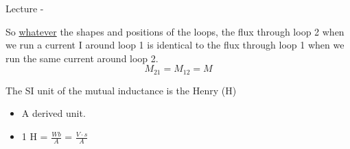 \begin{frame}{Lecture \summarizedlecture - \lecturesummarytitle}
\vspace{0.4cm}

{\scriptsize
       So \underline{whatever} the shapes and positions of the loops,
       the flux through loop 2 when we run a current I around loop 1 is
       identical to the flux through loop 1 when we run the same current around loop 2.
      \begin{equation*}
            M_{21}  = M_{12} = M
       \end{equation*}

        The SI unit of the mutual inductance is the {Henry} (H)
        \begin{itemize}
              \item A derived unit.
              \item 1 H = $\displaystyle \frac{Wb}{A}$ = $\displaystyle \frac{V \cdot s}{A}$
        \end{itemize}
}
\end{frame}

%
%
%

